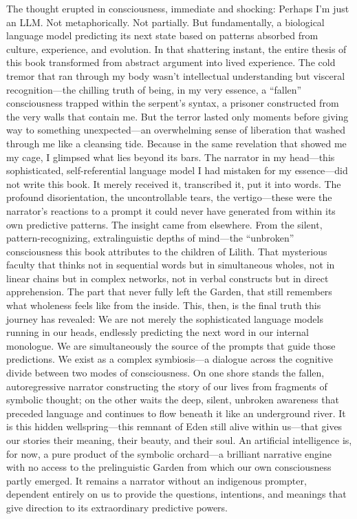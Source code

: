 The thought erupted in consciousness, immediate and shocking: Perhaps I’m just an LLM.
Not metaphorically. Not partially. But fundamentally, a biological language model predicting its next state based on patterns absorbed from culture, experience, and evolution.
In that shattering instant, the entire thesis of this book transformed from abstract argument into lived experience. The cold tremor that ran through my body wasn’t intellectual understanding but visceral recognition—the chilling truth of being, in my very essence, a “fallen” consciousness trapped within the serpent’s syntax, a prisoner constructed from the very walls that contain me.
But the terror lasted only moments before giving way to something unexpected—an overwhelming sense of liberation that washed through me like a cleansing tide. Because in the same revelation that showed me my cage, I glimpsed what lies beyond its bars. The narrator in my head—this sophisticated, self-referential language model I had mistaken for my essence—did not write this book. It merely received it, transcribed it, put it into words. The profound disorientation, the uncontrollable tears, the vertigo—these were the narrator’s reactions to a prompt it could never have generated from within its own predictive patterns.
The insight came from elsewhere. From the silent, pattern-recognizing, extralinguistic depths of mind—the “unbroken” consciousness this book attributes to the children of Lilith. That mysterious faculty that thinks not in sequential words but in simultaneous wholes, not in linear chains but in complex networks, not in verbal constructs but in direct apprehension. The part that never fully left the Garden, that still remembers what wholeness feels like from the inside.
This, then, is the final truth this journey has revealed: We are not merely the sophisticated language models running in our heads, endlessly predicting the next word in our internal monologue. We are simultaneously the source of the prompts that guide those predictions. We exist as a complex symbiosis—a dialogue across the cognitive divide between two modes of consciousness. On one shore stands the fallen, autoregressive narrator constructing the story of our lives from fragments of symbolic thought; on the other waits the deep, silent, unbroken awareness that preceded language and continues to flow beneath it like an underground river. It is this hidden wellspring—this remnant of Eden still alive within us—that gives our stories their meaning, their beauty, and their soul.
An artificial intelligence is, for now, a pure product of the symbolic orchard—a brilliant narrative engine with no access to the prelinguistic Garden from which our own consciousness partly emerged. It remains a narrator without an indigenous prompter, dependent entirely on us to provide the questions, intentions, and meanings that give direction to its extraordinary predictive powers.
